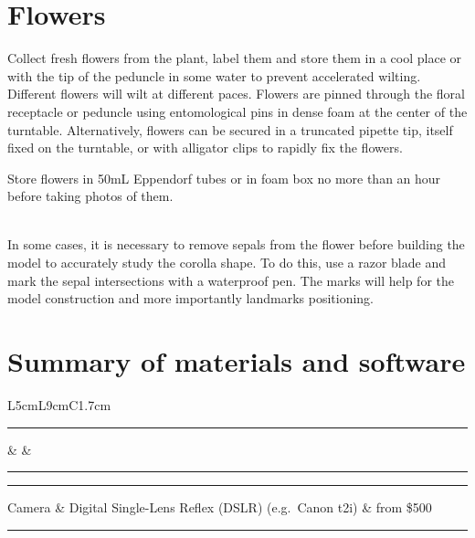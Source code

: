 \documentclass[
]{book}
\begin{document}
\hypertarget{flowers}{%
\section{Flowers}\label{flowers}}

Collect fresh flowers from the plant, label them and store them in a
cool place or with the tip of the peduncle in some water to prevent
accelerated wilting. Different flowers will wilt at different paces.
Flowers are pinned through the floral receptacle or peduncle using
entomological pins in dense foam at the center of the turntable.
Alternatively, flowers can be secured in a truncated pipette tip, itself
fixed on the turntable, or with alligator clips to rapidly fix the
flowers.

Store flowers in 50mL Eppendorf tubes or in foam box no more than an
hour before taking photos of them.\\
\strut \\
In some cases, it is necessary to remove sepals from the flower before
building the model to accurately study the corolla shape. To do this,
use a razor blade and mark the sepal intersections with a waterproof
pen. The marks will help for the model construction and more importantly
landmarks positioning.

\hypertarget{summary-of-materials-and-software}{%
\section{Summary of materials and software}\label{summary-of-materials-and-software}}

L5cm\textbar L9cm\textbar C1.7cm

\begin{center}\rule{0.5\linewidth}{0.5pt}\end{center}

\& \&\\

\begin{center}\rule{0.5\linewidth}{0.5pt}\end{center}

\hfill\break

\begin{center}\rule{0.5\linewidth}{0.5pt}\end{center}

Camera \& Digital Single-Lens Reflex (DSLR) (e.g.~Canon t2i) \& from
\$500\\

\begin{center}\rule{0.5\linewidth}{0.5pt}\end{center}
\end{document}
